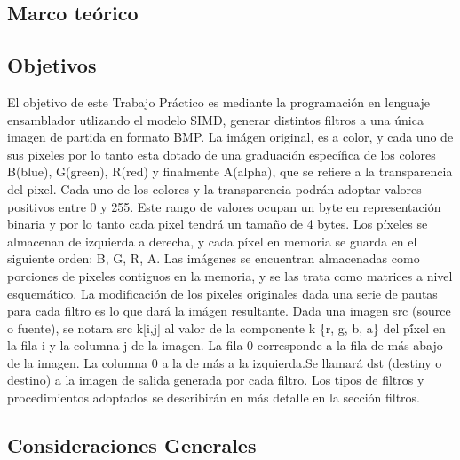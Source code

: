 \subsection{Marco teórico}


\subsection{Objetivos}

El objetivo de este Trabajo Práctico es mediante la programaci\'on en lenguaje ensamblador utlizando el modelo SIMD, generar distintos filtros a una \'unica imagen de partida en formato BMP. 
 La im\'agen original, es a color, y cada uno de sus pixeles por lo tanto esta dotado de una graduaci\'on espec\'ifica de los colores B(blue), G(green), R(red) y finalmente A(alpha), que se refiere a la transparencia del pixel. Cada uno de los colores y la transparencia podr\'an adoptar valores positivos entre 0 y 255. Este rango de valores ocupan un byte en representaci\'on binaria y por lo tanto cada pixel tendr\'a un tama\~no de 4 bytes.
Los p\'ixeles se almacenan de izquierda a derecha, y cada p\'ixel en memoria se guarda en el siguiente orden: B, G, R, A.
 Las im\'agenes se encuentran almacenadas como porciones de pixeles contiguos en la memoria, y se las trata como matrices a nivel esquem\'atico. La modificaci\'on de los pixeles originales dada una serie de pautas para cada filtro es lo que dar\'a la im\'agen resultante. 
 Dada una imagen src (source o fuente), se notara src k[i,j] al valor de la componente k  \{r, g, b, a\} del p\'íxel en la fila i y la columna j de la imagen. La fila 0 corresponde a la fila de más abajo de la imagen. La columna 0 a la de más a la izquierda.Se llamar\'a dst (destiny o destino) a la imagen de salida generada por cada filtro.
 Los tipos de filtros y procedimientos adoptados se describir\'an en m\'as detalle en la secci\'on filtros.

\subsection{Consideraciones Generales}




